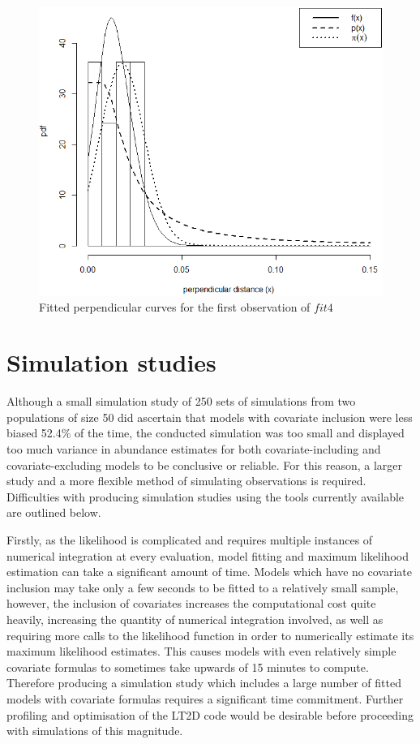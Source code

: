 \documentclass[11pt]{article}
\begin{document}
\begin{multicols}{2}
\begin{figure}[H]
\center
\includegraphics[scale=0.53]{fig12}
\caption{Fitted perpendicular curves for the first observation of $fit4$}
\end{figure}

\section{Simulation studies}
Although a small simulation study of 250 sets of simulations from two populations of size 50 did ascertain that models with covariate inclusion were less biased 52.4\% of the time, the conducted simulation was too small and displayed too much variance in abundance estimates for both covariate-including and covariate-excluding models to be conclusive or reliable. For this reason, a larger study and a more flexible method of simulating observations is required. Difficulties with producing simulation studies using the tools currently available are outlined below.

Firstly, as the \cite{Borchers} likelihood is complicated and requires multiple instances of numerical integration at every evaluation, model fitting and maximum likelihood estimation can take a significant amount of time. Models which have no covariate inclusion may take only a few seconds to be fitted to a relatively small sample, however, the inclusion of covariates increases the computational cost quite heavily, increasing the quantity of numerical integration involved, as well as requiring more calls to the likelihood function in order to numerically estimate its maximum likelihood estimates. This causes models with even relatively simple covariate formulas to sometimes take upwards of 15 minutes to compute. Therefore producing a simulation study which includes a large number of fitted models with covariate formulas requires a significant time commitment. Further profiling and optimisation of the LT2D code would be desirable before proceeding with simulations of this magnitude.\\\\


\end{multicols}
\end{document}
